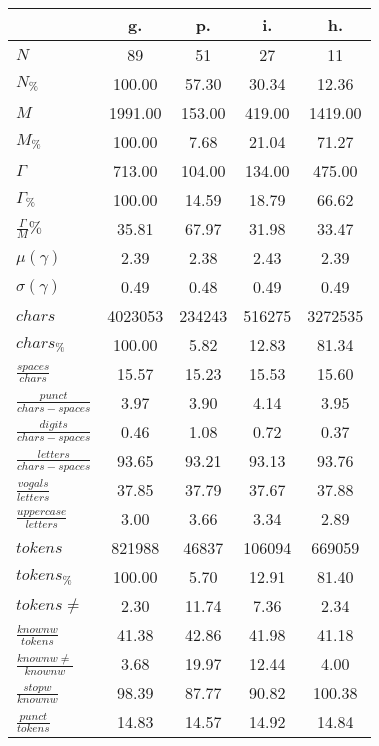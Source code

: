 \begin{table}[h!]
\begin{center}
\begin{tabular}{| l || c | c | c | c |}\hline
 & {\bf g.} & {\bf p.} & {\bf i.} & {\bf h.} \\\hline\hline
$N$ & 89  & 51  & 27  & 11 \\
$N_{\%}$ & 100.00  & 57.30  & 30.34  & 12.36 \\\hline
$M$ & 1991.00  & 153.00  & 419.00  & 1419.00 \\
$M_{\%}$ & 100.00  & 7.68  & 21.04  & 71.27 \\\hline
$\Gamma$ & 713.00  & 104.00  & 134.00  & 475.00 \\
$\Gamma_{\%}$ & 100.00  & 14.59  & 18.79  & 66.62 \\\hline
$\frac{\Gamma}{M}\%$ & 35.81  & 67.97  & 31.98  & 33.47 \\
$\mu(\gamma)$ & 2.39  & 2.38  & 2.43  & 2.39 \\
$\sigma(\gamma)$ & 0.49  & 0.48  & 0.49  & 0.49 \\\hline\hline
$chars$ & 4023053  & 234243  & 516275  & 3272535 \\
$chars_{\%}$ & 100.00  & 5.82  & 12.83  & 81.34 \\\hline
$\frac{spaces}{chars}$ & 15.57  & 15.23  & 15.53  & 15.60 \\
$\frac{punct}{chars-spaces}$ & 3.97  & 3.90  & 4.14  & 3.95 \\
$\frac{digits}{chars-spaces}$ & 0.46  & 1.08  & 0.72  & 0.37 \\\hline
$\frac{letters}{chars-spaces}$ & 93.65  & 93.21  & 93.13  & 93.76 \\
$\frac{vogals}{letters}$ & 37.85  & 37.79  & 37.67  & 37.88 \\
$\frac{uppercase}{letters}$ & 3.00  & 3.66  & 3.34  & 2.89 \\\hline\hline
$tokens$ & 821988  & 46837  & 106094  & 669059 \\
$tokens_{\%}$ & 100.00  & 5.70  & 12.91  & 81.40 \\
$tokens \neq$ & 2.30  & 11.74  & 7.36  & 2.34 \\\hline
$\frac{knownw}{tokens}$ & 41.38  & 42.86  & 41.98  & 41.18 \\
$\frac{knownw \neq}{knownw}$ & 3.68  & 19.97  & 12.44  & 4.00 \\\hline
$\frac{stopw}{knownw}$ & 98.39  & 87.77  & 90.82  & 100.38 \\
$\frac{punct}{tokens}$ & 14.83  & 14.57  & 14.92  & 14.84 \\

\end{tabular}
\end{center}
\end{table}
